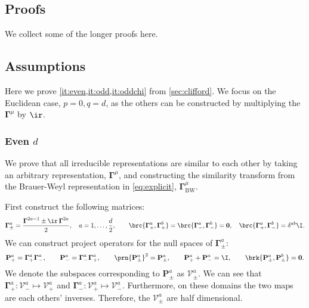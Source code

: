 \documentclass[11pt]{article}
\newcommand{\Gammab}{\boldsymbol{\Gamma}}
\begin{document}
\begin{appendix}

\section{Proofs}\label{sec:proofs}

We collect some of the longer proofs here.



\subsection{Assumptions}\label{sec:assume}

Here we prove \cref{it:even,it:odd,it:oddchi} from \cref{sec:clifford}.
We focus on the Euclidean case, \(p = 0, q = d\), as the others can be constructed by multiplying the \(\Gammab^\mu\) by \(\ir\).


\subsubsection{Even \texorpdfstring{\(d\)}{d}}\label{sec:evenclass}

We prove that all irreducible representations are similar to each other by taking an arbitrary representation, \(\Gammab^\mu\), and constructing the similarity transform from the Brauer-Weyl representation in \cref{eq:explicit}, \(\Gammab^\mu_\text{BW}\).

First construct the following matrices:
%
\begin{equation}\label{eq:raiselower}
  \Gammab^a_\pm = \frac{\Gammab^{2a-1} \pm \ir \, \Gammab^{2a}}{2},
  \quad a = 1,\dots,\frac{d}{2}, \qquad
  \brc{\Gammab_+^a, \Gammab_+^b} = \brc{\Gammab_-^a, \Gammab_-^b} = \mathbf{0},
  \quad \brc{\Gammab_+^a, \Gammab_-^b} = \delta^{ab} \I.
\end{equation}
%
We can construct project operators for the null spaces of \(\Gammab^a_\pm\):
%
\begin{equation*}
  \mathbf{P}^a_+ = \Gammab^a_+ \Gammab^a_-, \qquad
  \mathbf{P}^a_- = \Gammab^a_- \Gammab^a_+, \qquad
  \prn{\mathbf{P}^a_\pm}^2 = \mathbf{P}^a_\pm, \qquad
  \mathbf{P}^a_+ + \mathbf{P}^a_- = \I, \qquad
  \brk{\mathbf{P}^a_\pm, \mathbf{P}^b_\pm} = \mathbf{0}. 
\end{equation*}
%
We denote the subspaces corresponding to \(\mathbf{P}^a_\pm\) as \(\mathcal{V}^a_\pm\).
We can see that \( \Gammab^a_+ : \mathcal{V}^a_- \longmapsto \mathcal{V}^a_+ \) and \( \Gammab^a_- : \mathcal{V}^a_+ \longmapsto \mathcal{V}^a_- \).
Furthermore, on these domains the two maps are each others' inverses.
Therefore, the \(\mathcal{V}^a_\pm\) are half dimensional.


\end{appendix}
\end{document}

